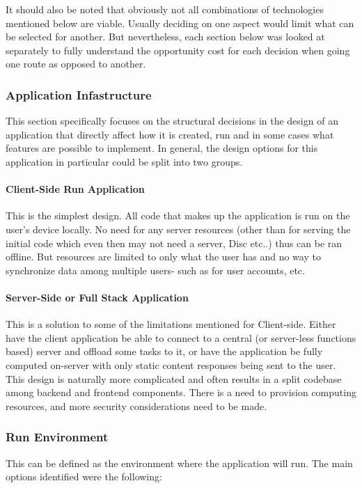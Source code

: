 It should also be noted that obviously not all combinations of technologies mentioned below are viable. Usually deciding on one aspect would limit what can be selected for another. But nevertheless, each section below was looked at separately to fully understand the opportunity cost for each decision when going one route as opposed to another.

\subsubsection{Application Infastructure}
This section specifically focuses on the structural decisions in the design of an application that directly affect how it is created, run and in some cases what features are possible to implement. In general, the design options for this application in particular could be split into two groups.

\paragraph{Client-Side Run Application}
This is the simplest design. All code that makes up the application is run on the user’s device locally. No need for any server resources (other than for serving the initial code which even then may not need a server, Disc etc..) thus can be ran offline. But resources are limited to only what the user has and no way to synchronize data among multiple users- such as for user accounts, etc.

\paragraph{Server-Side or Full Stack Application}
This is a solution to some of the limitations mentioned for Client-side. Either have the client application be able to connect to a central (or server-less functions based) server and offload some tasks to it, or have the application be fully computed on-server with only static content responses being sent to the user. This design is naturally more complicated and often results in a split codebase among backend and frontend components. There is a need to provision computing resources, and more security considerations need to be made.

\subsubsection{Run Environment}
This can be defined as the environment where the application will run. The main options identified were the following:

